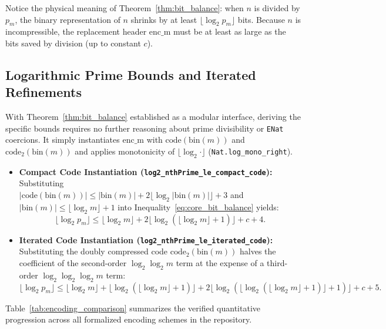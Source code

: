 \documentclass[acmsmall,natbib=false,nonacm]{acmart}
\begin{document}
Notice the physical meaning of Theorem~\ref{thm:bit_balance}: when $n$ is divided by $p_m$, the binary representation of $n$ shrinks by at least $\lfloor\log_2 p_m\rfloor$ bits. Because $n$ is incompressible, the replacement header $\text{enc\_m}$ must be at least as large as the bits saved by division (up to constant $c$).

\subsection{Logarithmic Prime Bounds and Iterated Refinements}
With Theorem~\ref{thm:bit_balance} established as a modular interface, deriving the specific bounds requires no further reasoning about prime divisibility or \texttt{ENat} coercions. It simply instantiates $\text{enc\_m}$ with $\text{code}(\text{bin}(m))$ and $\text{code}_2(\text{bin}(m))$ and applies monotonicity of $\lfloor\log_2 \cdot\rfloor$ (\texttt{Nat.log\_mono\_right}).

\begin{itemize}
    \item \textbf{Compact Code Instantiation (\texttt{log2\_nthPrime\_le\_compact\_code}):} Substituting \\ $|\text{code}(\text{bin}(m))| \le |\text{bin}(m)| + 2\lfloor\log_2|\text{bin}(m)|\rfloor + 3$ and $|\text{bin}(m)| \le \lfloor\log_2 m\rfloor + 1$ into Inequality~\eqref{eq:core_bit_balance} yields:
    \begin{equation}
        \label{eq:compact_log_bound}
        \lfloor\log_2 p_m\rfloor \le \lfloor\log_2 m\rfloor + 2\lfloor\log_2(\lfloor\log_2 m\rfloor + 1)\rfloor + c + 4.
    \end{equation}
    \item \textbf{Iterated Code Instantiation (\texttt{log2\_nthPrime\_le\_iterated\_code}):} Substituting the doubly compressed code $\text{code}_2(\text{bin}(m))$ halves the coefficient of the second-order $\log_2 \log_2 m$ term at the expense of a third-order $\log_2 \log_2 \log_2 m$ term:
    \begin{equation}
        \label{eq:iterated_log_bound}
        \lfloor\log_2 p_m\rfloor \le \lfloor\log_2 m\rfloor + \lfloor\log_2(\lfloor\log_2 m\rfloor + 1)\rfloor + 2\lfloor\log_2(\lfloor\log_2(\lfloor\log_2 m\rfloor + 1)\rfloor + 1)\rfloor + c + 5.
    \end{equation}
\end{itemize}

Table~\ref{tab:encoding_comparison} summarizes the verified quantitative progression across all formalized encoding schemes in the repository.
\end{document}
